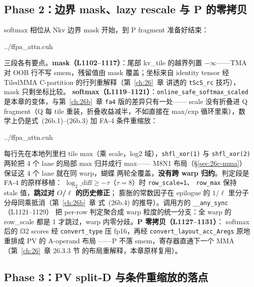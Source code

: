 \subsection{Phase 2：边界 mask、lazy rescale 与 P 的零拷贝}\label{sec:26c-rescale}

softmax 相位从 Nkv 边界 mask 开始，到 P fragment 准备好结束：

\begin{lstinputlisting}[linerange={1096-1131},firstnumber=auto,
  title={ffpa\_attn.cuh L1096-1131（Phase 2：mask + online softmax + warp vote + P 零拷贝）}]{../ffpa_attn.cuh}
\end{lstinputlisting}

三段各有要点。\textbf{mask（L1102--1117）}：尾部 kv\_tile 的越界列置
$-\infty$——TMA 对 OOB 行不写 smem，残留值由 mask 覆盖；坐标来自
identity tensor 经 TiledMMA C-partition 的行列重解释（第~\ref{ch:26}~章
讲透的 \texttt{tScS\_rc} 技巧），mask 只剩坐标比较。
\textbf{softmax（L1119--1121）}：\texttt{online\_safe\_softmax\_scaled}
是本章的变体，与第~\ref{ch:26b}~章 \texttt{fa4} 版的差异只有一处——
scale 没有折叠进 Q fragment（Q 每 tile 重装，折叠收益减半，不如直接在
max/exp 循环里乘），数学上仍是式~(26b.1)--(26b.3) 加 FA-4 条件重缩放：

\begin{lstinputlisting}[linerange={758-793},firstnumber=auto,
  title={ffpa\_attn.cuh L758-793（\texttt{online\_safe\_softmax\_scaled}：蝴蝶归约 + 条件重缩放判定）}]{../ffpa_attn.cuh}
\end{lstinputlisting}

每行先在本地列里扫 tile max（乘 scale，log2 域），\texttt{shfl\_xor(1)}
与 \texttt{shfl\_xor(2)} 两轮把 4 个 lane 的局部 max 归并成行 max——
M8N1 布局（\S\ref{sec:26c-mma}）保证这 4 个 lane 就在同 warp，蝴蝶
两轮全覆盖，\textbf{没有跨 warp 归约}。判定段是 FA-4 的原样移植：
$\log_2\_\text{diff} \ge -\tau$（$\tau{=}8$）时 \texttt{row\_scale=1}、
\texttt{row\_max} 保持 stale 值，\textbf{跳过对 $O$/$\ell$ 的历史修正}；
膨胀的常数因子在 epilogue 的 $1/\ell$ 里分子分母同乘抵消（第~\ref{ch:26b}~章
式~(26b.4) 的推导）。调用方的 \texttt{\_\_any\_sync}（L1121--1129）
把 per-row 判定聚合成 warp 粒度的统一分支：全 warp 的 row\_scale 都是
1 才跳过，warp 内零分歧。\textbf{P 零拷贝（L1127--1131）}：
softmax 后的 f32 scores 经 \texttt{convert\_type} 压 fp16，再经
\texttt{convert\_layout\_acc\_Aregs} 原地重排成 PV 的 A-operand 布局
——P 不落 smem，寄存器直通下一个 MMA（第~\ref{ch:26}~章 26.3.3 节
的布局重解释，本章原样复用）。

\subsection{Phase 3：PV split-D 与条件重缩放的落点}\label{sec:26c-pv}

